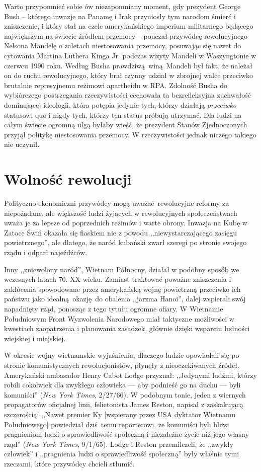 \documentclass[12pt]{book}
\newcommand{\sekcja}[1]{
  \addcontentsline{toc}{section}{#1}
  \section*{#1}
}
\begin{document}
Warto przypomnieć sobie ów niezapomniany moment, gdy prezydent George Bush – którego inwazje na Panamę i Irak przyniosły tym narodom śmierć i zniszczenie, i który stał na czele amerykańskiego imperium militarnego będącego największym na świecie źródłem przemocy – pouczał przywódcę rewolucyjnego Nelsona Mandelę o zaletach niestosowania przemocy, posuwając się nawet do cytowania Martina Luthera Kinga Jr. podczas wizyty Mandeli w Waszyngtonie w czerwcu 1990 roku. Według Busha prawdziwą winą Mandeli był fakt, że należał on do ruchu rewolucyjnego, który brał czynny udział w zbrojnej walce przeciwko brutalnie represyjnemu reżimowi apartheidu w RPA. Zdolność Busha do wybiórczego postrzegania rzeczywistości cechowała ta bezrefleksyjna zuchwałość dominującej ideologii, która potępia jedynie tych, którzy działają \textit{przeciwko} statusowi quo i nigdy tych, którzy ten status próbują utrzymać. Dla ludzi na całym świecie ogromną ulgą byłaby wieść, że prezydent Stanów Zjednoczonych przyjął politykę niestosowania przemocy. W rzeczywistości jednak niczego takiego nie uczynił.

\sekcja{Wolność rewolucji}
Polityczno-ekonomiczni przywódcy mogą uważać rewolucyjne reformy za niepożądane, ale większość ludzi żyjących w rewolucyjnych społeczeństwach uważa je za lepsze od poprzednich reżimów i warte obrony. Inwazja na Kubę w Zatoce Świń okazała się fiaskiem nie z powodu ,,niewystarczającego zasięgu powietrznego'', ale dlatego, że naród kubański zwarł szeregi po stronie swojego rządu i odparł najeźdźców.

Inny ,,zniewolony naród'', Wietnam Północny, działał w podobny sposób we wczesnych latach 70. XX wieku. Zamiast traktować poważne zniszczenia i zakłócenia spowodowane przez amerykańską wojnę powietrzną przeciwko ich państwu jako idealną okazję do obalenia ,,jarzma Hanoi'', dalej wspierali swój napadnięty rząd, ponosząc z tego tytułu ogromne ofiary. W Wietnamie Południowym Front Wyzwolenia Narodowego miał taktyczne możliwości w kwestiach zaopatrzenia i planowania zasadzek, głównie dzięki wsparciu ludności wiejskiej i miejskiej.

W okresie wojny wietnamskie wyjaśnienia, dlaczego ludzie opowiadali się po stronie komunistycznych rewolucjonistów, płynęły z nieoczekiwanych źródeł. Amerykański ambasador Henry Cabot Lodge przyznał: ,,Jedynymi ludźmi, którzy robili cokolwiek dla zwykłego człowieka — aby podnieść go na duchu — byli komuniści'' (\textit{New York Times}, 2/27/66). W podobnym tonie, jeden z wiernych propagatorów oficjalnej linii, felietonista James Reston, napisał z zaskakującą szczerością: ,,Nawet premier Ky [wspierany przez USA dyktator Wietnamu Południowego] powiedział dziś temu reporterowi, że komuniści byli bliżsi pragnieniom ludzi o sprawiedliwość społeczną i niezależne życie niż jego własny rząd'' (\textit{New York Times}, 9/1/65). Lodge i Reston przemilczeli, że ,,zwykły człowiek'' i ,,pragnienia ludzi o sprawiedliwość społeczną'' były właśnie tymi rzeczami, które przywódcy chcieli stłumić.
\end{document}
